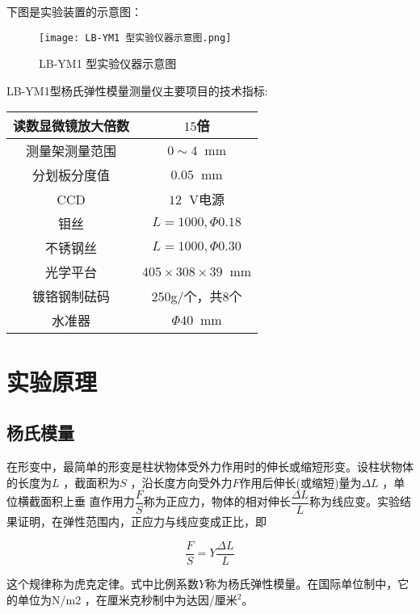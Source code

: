 \documentclass[11pt]{article}
\newcommand*{\unit}[1]{\mathop{}\!\mathrm{#1}}
\begin{document}
下图是实验装置的示意图：

\begin{figure}[H]
    \centering
    \texttt{[image: LB-YM1 型实验仪器示意图.png]}
    \caption{LB-YM1 型实验仪器示意图}
\end{figure}

LB-YM1型杨氏弹性模量测量仪主要项目的技术指标: 
    
\begin{table}[H]
  \centering
  \begin{tabular}{|c|c|}
    \hline
    读数显微镜放大倍数  & $15$倍 \\
    \hline
    测量架测量范围  & $0 \sim 4\unit{mm}$    \\
    \hline
    分划板分度值  & $0.05\unit{mm}$  \\
    \hline
    CCD    & $12\unit{V}$电源    \\
    \hline
    钼丝  & $L=1000, \Phi 0.18$    \\
    \hline
    不锈钢丝 & $L=1000, \Phi 0.30$ \\
    \hline
    光学平台 & $405 \times 308 \times 39\unit{mm}$ \\
    \hline
    镀铬钢制砝码 & 250g/个，共8个 \\
    \hline
    水准器 & $\Phi 40\unit{mm}$ \\
    \hline
  \end{tabular}
\end{table}

\section{实验原理}

\subsection{杨氏模量}

在形变中，最简单的形变是柱状物体受外力作用时的伸长或缩短形变。设柱状物体的长度为$L$ ，截面积为$S$ ，沿长度方向受外力$F$作用后伸长(或缩短)量为$\Delta L$ ，单位横截面积上垂 直作用力$\dfrac{F}{S}$称为正应力，物体的相对伸长$\dfrac{\Delta L}{L}$称为线应变。实验结果证明，在弹性范围内，正应力与线应变成正比，即

\begin{equation}
    \frac{F}{S} = Y \frac{\Delta L}{L}
\end{equation}

这个规律称为虎克定律。式中比例系数$Y$称为杨氏弹性模量。在国际单位制中，它的单位为N/m2 ，在厘米克秒制中为达因/厘米$^2$。
\end{document}
